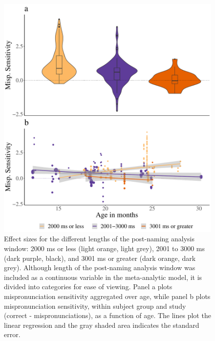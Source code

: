 \documentclass[
  english,
  man, noextraspace]{apa6}
\begin{document}
\begin{figure}
\centering
\includegraphics{VonHolzenBergmann_MPMetaAnalysis_files/figure-latex/PlotPostNameCondAge-1.pdf}
\caption{\label{fig:PlotPostNameCondAge}Effect sizes for the different lengths of the post-naming analysis window: 2000 ms or less (light orange, light grey), 2001 to 3000 ms (dark purple, black), and 3001 ms or greater (dark orange, dark grey). Although length of the post-naming analysis window was included as a continuous variable in the meta-analytic model, it is divided into categories for ease of viewing. Panel a plots mispronunciation sensitivity aggregated over age, while panel b plots mispronunciation sensitivity, within subject group and study (correct - mispronunciations), as a function of age. The lines plot the linear regression and the gray shaded area indicates the standard error.}
\end{figure}
\end{document}
